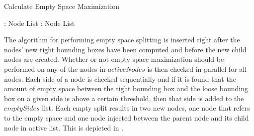 \begin{algorithm}
  \caption{Calculate Empty Space Maximization}
  \label{alg:emptySpaceMaximizing}
  \begin{algorithmic}
               { : Node List}
               { : Node List}{


                 \STATE{}
                     \ENDIF
                   \ENDFOR
                 \ENDFOR
                 \ENDFOR
                 \ENDIF

                 \STATE{}

  }
  \end{algorithmic}
\end{algorithm}


The algorithm for performing empty space splitting is inserted right after the
nodes' new tight bounding boxes have been computed and before the new child
nodes are created. Whether or not empty space maximization should be performed on
any of the nodes in $activeNodes$ is then checked in parallel for all
nodes. Each side of a node is checked sequentially and if it is found that the
amount of empty space between the tight bounding box and the loose bounding box
on a given side is above a certain threshold, then that side is added to the
$emptySides$ list. Each empty split results in two new nodes, one node that
refers to the empty space and one node injected between the parent node and its
child node in active list. This is depicted in .

